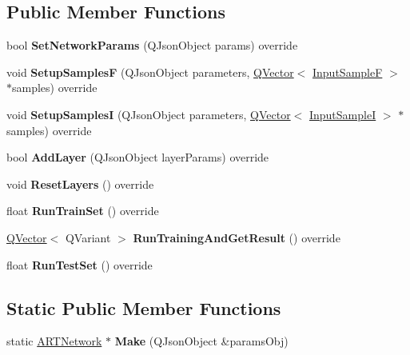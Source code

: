 \subsection*{Public Member Functions}
\begin{DoxyCompactItemize}
\item 
\mbox{\label{class_a_r_t_network_ab473057b03bf299702c879dff08a6128}} 
bool {\bfseries Set\+Network\+Params} (Q\+Json\+Object params) override
\item 
\mbox{\label{class_a_r_t_network_a7e6818c24d13b718d6d8807db46b0016}} 
void {\bfseries Setup\+SamplesF} (Q\+Json\+Object parameters, \hyperlink{class_q_vector}{Q\+Vector}$<$ \hyperlink{class_q_pair}{Input\+SampleF} $>$ $\ast$samples) override
\item 
\mbox{\label{class_a_r_t_network_a1f5750542a93bffeedacf74f780a2f2b}} 
void {\bfseries Setup\+SamplesI} (Q\+Json\+Object parameters, \hyperlink{class_q_vector}{Q\+Vector}$<$ \hyperlink{class_q_pair}{Input\+SampleI} $>$ $\ast$samples) override
\item 
\mbox{\label{class_a_r_t_network_a6025aa2fef98b81bc1dd9346fee1fd14}} 
bool {\bfseries Add\+Layer} (Q\+Json\+Object layer\+Params) override
\item 
\mbox{\label{class_a_r_t_network_aa2ceed6fcdc4c73d0715d09881196569}} 
void {\bfseries Reset\+Layers} () override
\item 
\mbox{\label{class_a_r_t_network_affab976a674fe5c0626ce0adc896ba2b}} 
float {\bfseries Run\+Train\+Set} () override
\item 
\mbox{\label{class_a_r_t_network_a2e9df6184463673c7620bd079609d727}} 
\hyperlink{class_q_vector}{Q\+Vector}$<$ Q\+Variant $>$ {\bfseries Run\+Training\+And\+Get\+Result} () override
\item 
\mbox{\label{class_a_r_t_network_ada8fa0752d7404bdac17955f23d1cf1a}} 
float {\bfseries Run\+Test\+Set} () override
\end{DoxyCompactItemize}
\subsection*{Static Public Member Functions}
\begin{DoxyCompactItemize}
\item 
\mbox{\label{class_a_r_t_network_acc61c58d3082855607710e0f5266738c}} 
static \hyperlink{class_a_r_t_network}{A\+R\+T\+Network} $\ast$ {\bfseries Make} (Q\+Json\+Object \&params\+Obj)
\end{DoxyCompactItemize}
